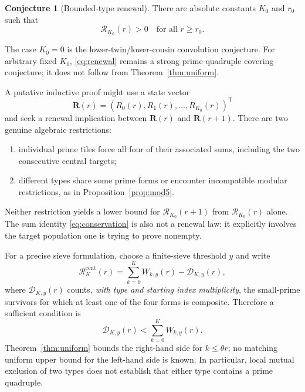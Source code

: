 \documentclass[11pt,a4paper]{article}
\theoremstyle{definition}
\newtheorem{conjecture}[theorem]{Conjecture}
\theoremstyle{remark}
\begin{document}
\begin{conjecture}[Bounded-type renewal]\label{conj:renewal}
There are absolute constants $K_0$ and $r_0$ such that
\begin{equation}\label{eq:renewal}
 \boxed{\displaystyle \mathcal R_{K_0}(r)>0\quad\text{for all }r\ge r_0.}
\end{equation}
\end{conjecture}
The case $K_0=0$ is the lower-twin/lower-cousin convolution conjecture. For arbitrary fixed $K_0$, \eqref{eq:renewal} remains a strong prime-quadruple covering conjecture; it does not follow from Theorem~\ref{thm:uniform}.

A putative inductive proof might use a state vector
\begin{equation}
 \mathbf R(r)=(R_0(r),R_1(r),\ldots,R_{K_0}(r))^{\mathsf T}
\end{equation}
and seek a renewal implication between $\mathbf R(r)$ and $\mathbf R(r+1)$. There are two genuine algebraic restrictions:
\begin{enumerate}[label=(\roman*),leftmargin=26pt]
 \item individual prime tiles force all four of their associated sums, including the two consecutive central targets;
 \item different types share some prime forms or encounter incompatible modular restrictions, as in Proposition~\ref{prop:mod5}.
\end{enumerate}
Neither restriction yields a lower bound for $\mathcal R_{K_0}(r+1)$ from $\mathcal R_{K_0}(r)$ alone.  The sum identity \eqref{eq:conservation} is also not a renewal law: it explicitly involves the target population one is trying to prove nonempty.

For a precise sieve formulation, choose a finite-sieve threshold $y$ and write
\begin{equation}
 \mathcal R_K^{\mathrm{cent}}(r)
 =\sum_{k=0}^K W_{k,y}(r)-\mathcal D_{K,y}(r),
\end{equation}
where $\mathcal D_{K,y}(r)$ counts, \emph{with type and starting index multiplicity}, the small-prime survivors for which at least one of the four forms is composite.  Therefore a sufficient condition is
\begin{equation}\label{eq:missing}
 \boxed{\displaystyle
 \mathcal D_{K,y}(r)<\sum_{k=0}^K W_{k,y}(r).}
\end{equation}
Theorem~\ref{thm:uniform} bounds the right-hand side for $k\le\theta r$; no matching uniform upper bound for the left-hand side is known.  In particular, local mutual exclusion of two types does not establish that either type contains a prime quadruple.
\end{document}
